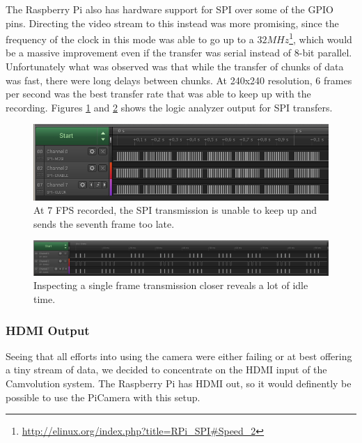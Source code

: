 The Raspberry Pi also has hardware support for SPI over some of the GPIO pins.
Directing the video stream to this instead was more promising,
since the frequency of the clock in this mode was able to go up to a $32MHz$\footnote{\url{http://elinux.org/index.php?title=RPi\_SPI\#Speed\_2}},
which would be a massive improvement even if the transfer was serial instead of 8-bit parallel.
Unfortunately what was observed was that while the transfer of chunks of data was fast,
there were long delays between chunks.
At 240x240 resolution, 6 frames per second was the best transfer rate that was able to keep up with the recording.
Figures \ref{fig:Logic7fps} and \ref{fig:Logic1Frame} shows the logic analyzer output for SPI transfers.

\begin{figure}
    \centering
    \includegraphics[width=\linewidth]{img/logic/7fps}
    \caption{At 7 FPS recorded, the SPI transmission is unable to keep up and sends the seventh frame too late.}
    \label{fig:Logic7fps}
\end{figure}

\begin{figure}
    \centering
    \includegraphics[width=\linewidth]{img/logic/1frame}
    \caption{Inspecting a single frame transmission closer reveals a lot of idle time.}
    \label{fig:Logic1Frame}
\end{figure}

\subsubsection{HDMI Output}
Seeing that all efforts into using the camera were either failing or at best offering a tiny stream of data,
we decided to concentrate on the HDMI input of the Camvolution system.
The Raspberry Pi has HDMI out, so it would definently be possible to use the PiCamera with this setup.

